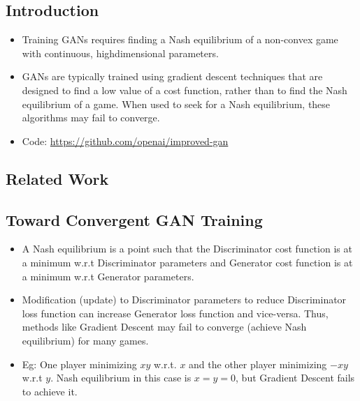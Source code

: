 \documentclass{article}
\begin{document}
    \subsection{Introduction}\label{subsec:Improved_Techniques_for_Training_GANs:introduction}
    \begin{itemize}
        \item Training GANs requires finding a Nash equilibrium of a non-convex game with continuous, highdimensional parameters.
        \item GANs are typically trained using gradient descent techniques that are designed to find a low value of a cost function, rather than to find the Nash equilibrium of a game.
        When used to seek for a Nash equilibrium, these algorithms may fail to converge.
        \item Code: \url{https://github.com/openai/improved-gan}
    \end{itemize}

    \subsection{Related Work}\label{subsec:Improved_Techniques_for_Training_GANs:related-work}

    \subsection{Toward Convergent GAN Training}\label{subsec:Improved_Techniques_for_Training_GANs:toward-convergent-gan-training}
    \begin{itemize}
        \item A Nash equilibrium is a point such that the Discriminator cost function is at a minimum w.r.t Discriminator parameters and Generator cost function is at a minimum w.r.t Generator parameters.
        \item Modification (update) to Discriminator parameters to reduce Discriminator loss function can increase Generator loss function and vice-versa.
        Thus, methods like Gradient Descent may fail to converge (achieve Nash equilibrium) for many games.
        \item Eg: One player minimizing $xy$ w.r.t. $x$ and the other player minimizing $-xy$ w.r.t $y$.
        Nash equilibrium in this case is $x=y=0$, but Gradient Descent fails to achieve it.
    \end{itemize}
\end{document}

